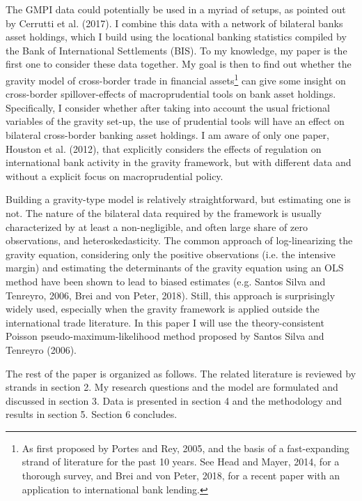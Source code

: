 \documentclass[12pt,a4paper]{article}
\begin{document}
The GMPI data could potentially be used in a myriad of setups, as pointed out by Cerrutti et al. (2017). I combine this data with a network of bilateral banks asset holdings, which I build using the locational banking statistics compiled by the Bank of International Settlements (BIS). To my knowledge, my paper is the first one to consider these data together. My goal is then to find out whether the gravity model of cross-border trade in financial assets\footnote{As first proposed by Portes and Rey, 2005, and the basis of a fast-expanding strand of literature for the past 10 years. See Head and Mayer, 2014, for a thorough survey, and Brei and von Peter, 2018, for a recent paper with an application to international bank lending.} can give some insight on cross-border spillover-effects of macroprudential tools on bank asset holdings. Specifically, I consider whether after taking into account the usual frictional variables of the gravity set-up, the use of prudential tools will have an effect on bilateral cross-border banking asset holdings. I am aware of only one paper, Houston et al. (2012), that explicitly considers the effects of regulation on international bank activity in the gravity framework, but with different data and without a explicit focus on macroprudential policy. 

Building a gravity-type model is relatively straightforward, but estimating one is not. The nature of the bilateral data required by the framework is usually characterized by at least a non-negligible, and often large share of zero observations, and heteroskedasticity. The common approach of log-linearizing the gravity equation, considering only the positive observations (i.e. the intensive margin) and estimating the determinants of the gravity equation using an OLS method have been shown to lead to biased estimates (e.g. Santos Silva and Tenreyro, 2006, Brei and von Peter, 2018). Still, this approach is surprisingly widely used, especially when the gravity framework is applied outside the international trade literature. In this paper I will use the theory-consistent Poisson pseudo-maximum-likelihood method proposed by Santos Silva and Tenreyro (2006). 

The rest of the paper is organized as follows. The related literature is reviewed by strands in section 2. My research questions and the model are formulated and discussed in section 3. Data is presented in section 4 and the methodology and results in section 5. Section 6 concludes. 
\end{document}
